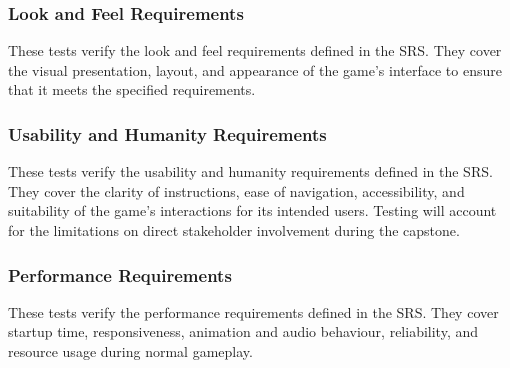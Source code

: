\documentclass[10pt,titlepage]{article}
\begin{document}
\subsubsection{Look and Feel Requirements}
\label{sec:LookAndFeelNFRTests}

These tests verify the look and feel requirements defined
in the SRS. They cover the visual presentation, layout,
and appearance of the game's interface to ensure that
it meets the specified requirements.




\subsubsection{Usability and Humanity Requirements}
\label{sec:UsabilityHumanityNFRTests}

These tests verify the usability and humanity requirements
defined in the SRS. They cover the clarity of instructions,
ease of navigation, accessibility, and suitability of the
game's interactions for its intended users. Testing will
account for the limitations on direct stakeholder involvement
during the capstone.


\subsubsection{Performance Requirements}\label{sec:PerformanceNFRTests}

These tests verify the performance requirements defined
in the SRS. They cover startup time, responsiveness,
animation and audio behaviour, reliability, and resource
usage during normal gameplay.
\end{document}
